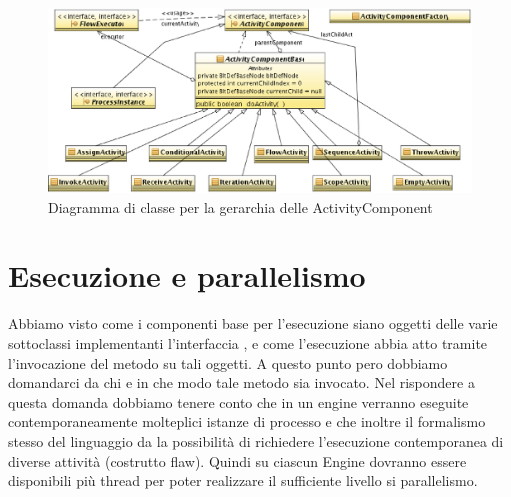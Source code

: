 \begin{figure}[p]
\begin{center}
\includegraphics[angle=90,scale=0.80]
{architettura_interna/dia/actclass}
\caption[Gerarchia delle ActivityComponent]{
   	\textsf{{\small Diagramma di classe per la gerarchia delle
   	ActivityComponent}} }
  \label{fig:actclass}
\end{center}
\end{figure}

\section{Esecuzione e parallelismo}
Abbiamo visto come i componenti base per l'esecuzione siano oggetti delle varie
sottoclassi implementanti l'interfaccia , e come
l'esecuzione abbia atto tramite l'invocazione del metodo
 su tali oggetti. A questo punto pero dobbiamo
domandarci da chi e in che modo tale metodo sia invocato. Nel rispondere a questa
domanda dobbiamo tenere conto che in un engine verranno eseguite
contemporaneamente molteplici istanze di processo e che inoltre il formalismo
stesso del linguaggio da la possibilità di richiedere l'esecuzione contemporanea
di diverse attività (costrutto flaw). Quindi su ciascun Engine dovranno essere
disponibili più thread per poter realizzare il sufficiente livello si
parallelismo.

